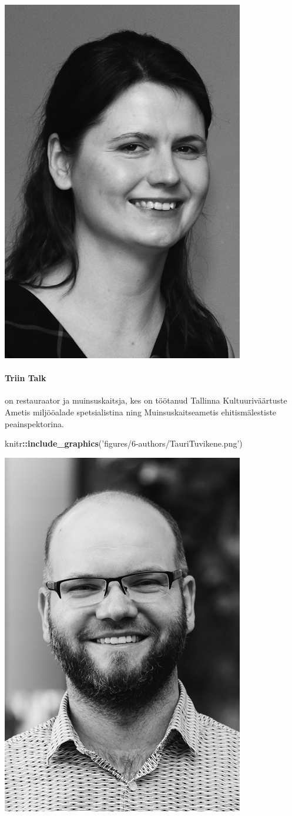 \documentclass[estonian,]{article}
\newenvironment{Shaded}{\begin{snugshade}}{\end{snugshade}}
\newcommand{\KeywordTok}[1]{\textcolor[rgb]{0.13,0.29,0.53}{\textbf{#1}}}
\newcommand{\NormalTok}[1]{#1}
\newcommand{\OperatorTok}[1]{\textcolor[rgb]{0.81,0.36,0.00}{\textbf{#1}}}
\newcommand{\StringTok}[1]{\textcolor[rgb]{0.31,0.60,0.02}{#1}}
\let\oldparagraph\paragraph
\renewcommand{\paragraph}[1]{\oldparagraph{#1}\mbox{}}
\begin{document}
\begin{flushleft}\includegraphics[width=0.5\linewidth]{figures/6-authors/TriinTalk} \end{flushleft}

\hypertarget{triin-talk}{%
\paragraph{Triin Talk}\label{triin-talk}}

on restauraator ja muinsuskaitsja, kes on töötanud Tallinna Kultuuriväärtuste Ametis miljööalade spetsialistina ning Muinsuskaitseametis ehitismälestiste peainspektorina.

\begin{Shaded}
\begin{Highlighting}[]
\NormalTok{knitr}\OperatorTok{::}\KeywordTok{include_graphics}\NormalTok{(}\StringTok{'figures/6-authors/TauriTuvikene.png'}\NormalTok{)}
\end{Highlighting}
\end{Shaded}

\begin{flushleft}\includegraphics[width=0.5\linewidth]{figures/6-authors/TauriTuvikene} \end{flushleft}
\end{document}

